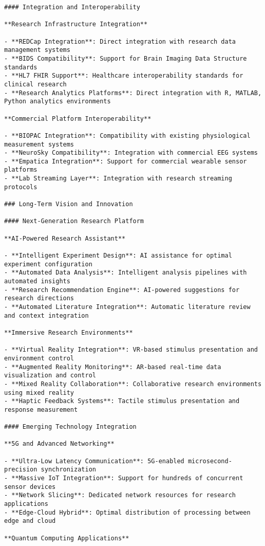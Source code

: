 \documentclass[11pt,a4paper]{report}
\begin{document}
\begin{verbatim}
#### Integration and Interoperability

**Research Infrastructure Integration**

- **REDCap Integration**: Direct integration with research data management systems
- **BIDS Compatibility**: Support for Brain Imaging Data Structure standards
- **HL7 FHIR Support**: Healthcare interoperability standards for clinical research
- **Research Analytics Platforms**: Direct integration with R, MATLAB, Python analytics environments

**Commercial Platform Interoperability**

- **BIOPAC Integration**: Compatibility with existing physiological measurement systems
- **NeuroSky Compatibility**: Integration with commercial EEG systems
- **Empatica Integration**: Support for commercial wearable sensor platforms
- **Lab Streaming Layer**: Integration with research streaming protocols

### Long-Term Vision and Innovation

#### Next-Generation Research Platform

**AI-Powered Research Assistant**

- **Intelligent Experiment Design**: AI assistance for optimal experiment configuration
- **Automated Data Analysis**: Intelligent analysis pipelines with automated insights
- **Research Recommendation Engine**: AI-powered suggestions for research directions
- **Automated Literature Integration**: Automatic literature review and context integration

**Immersive Research Environments**

- **Virtual Reality Integration**: VR-based stimulus presentation and environment control
- **Augmented Reality Monitoring**: AR-based real-time data visualization and control
- **Mixed Reality Collaboration**: Collaborative research environments using mixed reality
- **Haptic Feedback Systems**: Tactile stimulus presentation and response measurement

#### Emerging Technology Integration

**5G and Advanced Networking**

- **Ultra-Low Latency Communication**: 5G-enabled microsecond-precision synchronization
- **Massive IoT Integration**: Support for hundreds of concurrent sensor devices
- **Network Slicing**: Dedicated network resources for research applications
- **Edge-Cloud Hybrid**: Optimal distribution of processing between edge and cloud

**Quantum Computing Applications**


\end{verbatim}
\end{document}
